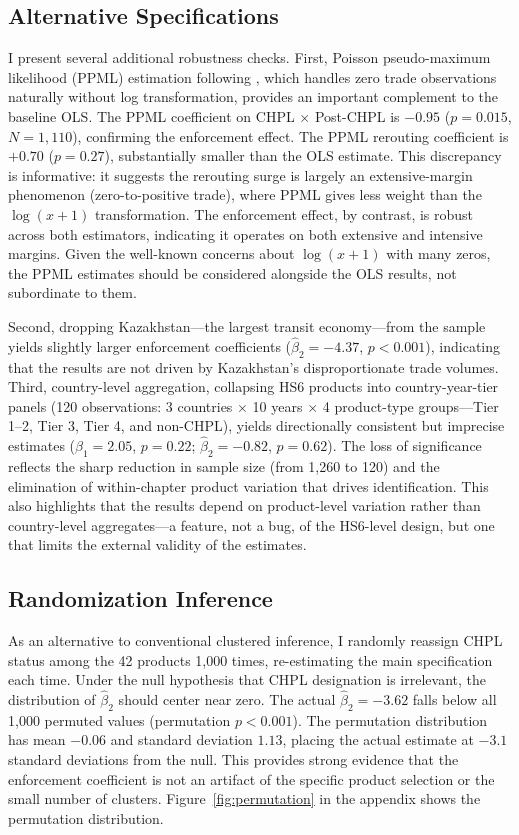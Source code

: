 \documentclass[12pt]{article}
\begin{document}
\subsection{Alternative Specifications}

I present several additional robustness checks. First, Poisson pseudo-maximum likelihood (PPML) estimation following \citet{silva2006log}, which handles zero trade observations naturally without log transformation, provides an important complement to the baseline OLS. The PPML coefficient on CHPL $\times$ Post-CHPL is $-0.95$ ($p = 0.015$, $N = 1{,}110$), confirming the enforcement effect. The PPML rerouting coefficient is $+0.70$ ($p = 0.27$), substantially smaller than the OLS estimate. This discrepancy is informative: it suggests the rerouting surge is largely an extensive-margin phenomenon (zero-to-positive trade), where PPML gives less weight than the $\log(x+1)$ transformation. The enforcement effect, by contrast, is robust across both estimators, indicating it operates on both extensive and intensive margins. Given the well-known concerns about $\log(x+1)$ with many zeros, the PPML estimates should be considered alongside the OLS results, not subordinate to them.

Second, dropping Kazakhstan---the largest transit economy---from the sample yields slightly larger enforcement coefficients ($\hat{\beta}_2 = -4.37$, $p < 0.001$), indicating that the results are not driven by Kazakhstan's disproportionate trade volumes. Third, country-level aggregation, collapsing HS6 products into country-year-tier panels (120 observations: 3 countries $\times$ 10 years $\times$ 4 product-type groups---Tier 1--2, Tier 3, Tier 4, and non-CHPL), yields directionally consistent but imprecise estimates ($\hat{\beta}_1 = 2.05$, $p = 0.22$; $\hat{\beta}_2 = -0.82$, $p = 0.62$). The loss of significance reflects the sharp reduction in sample size (from 1,260 to 120) and the elimination of within-chapter product variation that drives identification. This also highlights that the results depend on product-level variation rather than country-level aggregates---a feature, not a bug, of the HS6-level design, but one that limits the external validity of the estimates.

\subsection{Randomization Inference}

As an alternative to conventional clustered inference, I randomly reassign CHPL status among the 42 products 1,000 times, re-estimating the main specification each time. Under the null hypothesis that CHPL designation is irrelevant, the distribution of $\hat{\beta}_2$ should center near zero. The actual $\hat{\beta}_2 = -3.62$ falls below all 1,000 permuted values (permutation $p < 0.001$). The permutation distribution has mean $-0.06$ and standard deviation $1.13$, placing the actual estimate at $-3.1$ standard deviations from the null. This provides strong evidence that the enforcement coefficient is not an artifact of the specific product selection or the small number of clusters. Figure~\ref{fig:permutation} in the appendix shows the permutation distribution.
\end{document}
